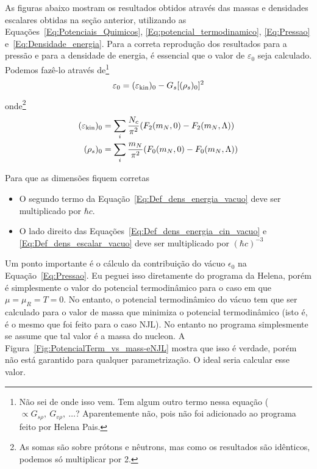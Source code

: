 As figuras abaixo mostram os resultados obtidos através das massas e densidades escalares obtidas na seção anterior, utilizando as Equações~\eqref{Eq:Potenciais_Quimicos}, \eqref{Eq:potencial_termodinamico}, \eqref{Eq:Pressao} e~\eqref{Eq:Densidade_energia}. Para a correta reprodução dos resultados para a pressão e para a densidade de energia, é essencial que o valor de $\varepsilon_0$ seja calculado. Podemos fazê-lo através de\footnote{Não sei de onde isso vem. Tem algum outro termo nessa equação ($\propto G_{s\rho},~G_{v\rho},~\dots$? Aparentemente não, pois não foi adicionado ao programa feito por Helena Pais.}
\begin{equation}\label{Eq:Def_dens_energia_vacuo}
	\varepsilon_0 = (\varepsilon_{\rm{kin}})_0 - G_s [(\rho_s)_0]^2
\end{equation}
%
onde\footnote{As somas são sobre prótons e nêutrons, mas como os resultados são idênticos, podemos só multiplicar por 2.}
\begin{align}
	(\varepsilon_{\rm{kin}})_0 &= \sum_i \frac{N_c}{\pi^2} (F_2(m_N,0) - F_2(m_N, \Lambda)) \label{Eq:Def_dens_energia_cin_vacuo}\\
	(\rho_s)_0 &= \sum_i \frac{m_N}{\pi^2} (F_0(m_N, 0) - F_0(m_N, \Lambda)) \label{Eq:Def_dens_escalar_vacuo}
\end{align}

Para que as dimensões fiquem corretas
\begin{itemize}
	\item O segundo termo da Equação~\eqref{Eq:Def_dens_energia_vacuo} deve ser multiplicado por $\hbar c$.
	\item O lado direito das Equações~\eqref{Eq:Def_dens_energia_cin_vacuo} e \eqref{Eq:Def_dens_escalar_vacuo} deve ser multiplicado por $(\hbar c)^{-3}$
\end{itemize}

Um ponto importante é o cálculo da contribuição do vácuo $\epsilon_0$ na Equação~\eqref{Eq:Pressao}. Eu peguei isso diretamente do programa da Helena, porém é simplesmente o valor do potencial termodinâmico para o caso em que $\mu = \mu_R = T = 0$. No entanto, o potencial termodinâmico do vácuo tem que ser calculado para o valor de massa que minimiza o potencial termodinâmico (isto é, é o mesmo que foi feito para o caso NJL). No entanto no programa simplesmente se assume que tal valor é a massa do nucleon. A Figura~\ref{Fig:PotencialTerm_vs_mass-eNJL} mostra que isso é verdade, porém não está garantido para qualquer parametrização. O ideal seria calcular esse valor.

